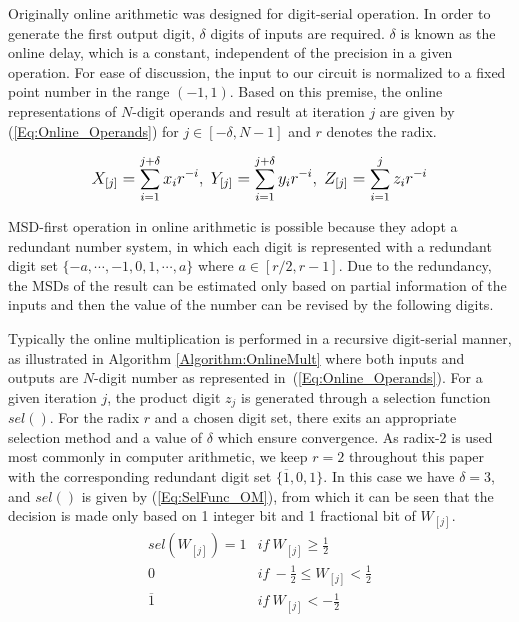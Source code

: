 \documentclass[journal]{IEEEtran}
\begin{document}
Originally online arithmetic was designed for digit-serial operation. In order to generate the first output digit, $\delta$ digits of inputs are required. $\delta$ is known as the online delay, which is a constant, independent of the precision in a given operation. For ease of discussion, the input to our circuit is normalized to a fixed point number in the range $(-1,1)$. Based on this premise, the online representations of $N$-digit operands and result at iteration $j$ are given by (\ref{Eq:Online_Operands}) for $j\in[-\delta,N-1]$ and $r$ denotes the radix.


\begin{eqnarray}\label{Eq:Online_Operands}
\footnotesize
  X_{[j]}=\sum_{i=1}^{j+\delta}x_ir^{-i},~Y_{[j]}=\sum_{i=1}^{j+\delta}y_ir^{-i},~Z_{[j]}=\sum_{i=1}^{j}z_ir^{-i}
\normalsize
\end{eqnarray}


MSD-first operation in online arithmetic is possible because they adopt a redundant number system, in which each digit is represented with a redundant digit set $\{-a, \cdots,-1, 0, 1, \cdots, a\}$ where $a\in[r/2,r-1]$. Due to the redundancy, the MSDs of the result can be estimated only based on partial information of the inputs and then the value of the number can be revised by the following digits.

Typically the online multiplication is performed in a recursive digit-serial manner, as illustrated in Algorithm \ref{Algorithm:OnlineMult} where both inputs and outputs are $N$-digit number as represented in~(\ref{Eq:Online_Operands}). For a given iteration $j$, the product digit $z_j$ is generated through a selection function $sel()$. For the radix $r$ and a chosen digit set, there exits an appropriate selection method and a value of $\delta$ which ensure convergence. As radix-2 is used most commonly in computer arithmetic, we keep $r=2$ throughout this paper with the corresponding redundant digit set $\{\overline{1},0,1\}$. In this case we have $\delta=3$, and $sel()$ is given by (\ref{Eq:SelFunc_OM}), from which it can be seen that the decision is made only based on 1 integer bit and 1 fractional bit of $W_{[j]}$.
\begin{equation}\label{Eq:SelFunc_OM}
\begin{array}{ll}
  sel(W_{[j]})=
    1 & if \ W_{[j]} \geq \frac{1}{2} \\
    0 &  if  \ -\frac{1}{2}\leq W_{[j]}<\frac{1}{2} \\
    \overline{1} & if \ W_{[j]}<-\frac{1}{2}
\end{array}
\end{equation}
\end{document}
